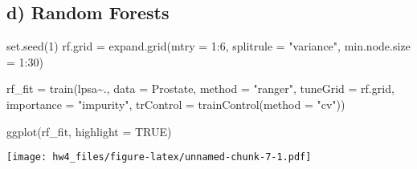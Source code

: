 \documentclass[
]{article}
\newenvironment{Shaded}{\begin{snugshade}}{\end{snugshade}}
\newcommand{\AttributeTok}[1]{\textcolor[rgb]{0.77,0.63,0.00}{#1}}
\newcommand{\ConstantTok}[1]{\textcolor[rgb]{0.00,0.00,0.00}{#1}}
\newcommand{\DecValTok}[1]{\textcolor[rgb]{0.00,0.00,0.81}{#1}}
\newcommand{\FloatTok}[1]{\textcolor[rgb]{0.00,0.00,0.81}{#1}}
\newcommand{\FunctionTok}[1]{\textcolor[rgb]{0.00,0.00,0.00}{#1}}
\newcommand{\NormalTok}[1]{#1}
\newcommand{\OtherTok}[1]{\textcolor[rgb]{0.56,0.35,0.01}{#1}}
\newcommand{\SpecialCharTok}[1]{\textcolor[rgb]{0.00,0.00,0.00}{#1}}
\newcommand{\StringTok}[1]{\textcolor[rgb]{0.31,0.60,0.02}{#1}}
\begin{document}
\hypertarget{d-random-forests}{%
\subsection{d) Random Forests}\label{d-random-forests}}

\begin{Shaded}
\begin{Highlighting}[]
\FunctionTok{set.seed}\NormalTok{(}\DecValTok{1}\NormalTok{)}
\NormalTok{rf.grid }\OtherTok{=} \FunctionTok{expand.grid}\NormalTok{(}\AttributeTok{mtry =} \DecValTok{1}\SpecialCharTok{:}\DecValTok{6}\NormalTok{, }\AttributeTok{splitrule =} \StringTok{"variance"}\NormalTok{, }\AttributeTok{min.node.size =} \DecValTok{1}\SpecialCharTok{:}\DecValTok{30}\NormalTok{)}

\NormalTok{rf\_fit }\OtherTok{=} \FunctionTok{train}\NormalTok{(lpsa}\SpecialCharTok{\textasciitilde{}}\NormalTok{.,}
               \AttributeTok{data =}\NormalTok{ Prostate,}
               \AttributeTok{method =} \StringTok{"ranger"}\NormalTok{,}
               \AttributeTok{tuneGrid =}\NormalTok{ rf.grid,}
               \AttributeTok{importance =} \StringTok{"impurity"}\NormalTok{,}
               \AttributeTok{trControl =} \FunctionTok{trainControl}\NormalTok{(}\AttributeTok{method =} \StringTok{"cv"}\NormalTok{))}

\FunctionTok{ggplot}\NormalTok{(rf\_fit, }\AttributeTok{highlight =} \ConstantTok{TRUE}\NormalTok{)}
\end{Highlighting}
\end{Shaded}

\texttt{[image: hw4\_files/figure-latex/unnamed-chunk-7-1.pdf]}

\begin{Shaded}
\end{Shaded}
\end{document}
